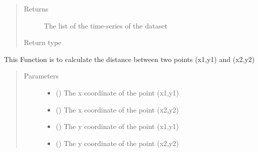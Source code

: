 \documentclass[letterpaper,10pt,english]{sphinxmanual}
\begin{document}
\begin{fulllineitems}
\begin{fulllineitems}
\begin{quote}
\begin{description}
\begin{itemize}
\end{itemize}

\item[{Returns}] \leavevmode
The list of the time-series of the dataset

\item[{Return type}] \leavevmode
{}

\end{description}\end{quote}

\end{fulllineitems}


\begin{fulllineitems}
\label{\detokenize{AgentTools.util:AgentTools.util.OutputUtil.OutputUtil.point_distance}}
This Function is to calculate the distance between two points (x1,y1) and (x2,y2)
\begin{quote}\begin{description}
\item[{Parameters}] \leavevmode\begin{itemize}
\item {} 
 () \textendash{} The x coordinate of the point (x1,y1)

\item {} 
 () \textendash{} The x coordinate of the point (x2,y2)

\item {} 
 () \textendash{} The y coordinate of the point (x1,y1)

\item {} 
 () \textendash{} The y coordinate of the point (x2,y2)


\end{itemize}
\end{description}
\end{quote}
\end{fulllineitems}
\end{fulllineitems}
\end{document}
